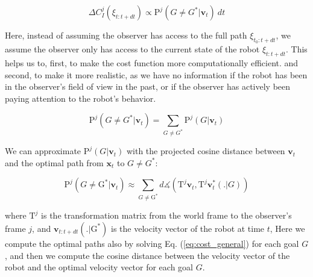 \begin{equation}
    \label{eq:cost_leg}
    \Delta C_{I}^j(\xi_{t:t+dt}) \propto  \mathrm{P}^j(G \neq G^* | \mathbf{v}_t) ~dt
\end{equation}

\noindent
Here, instead of assuming the observer has access to the full path $\xi_{t_0:t+dt}$,
we assume the observer only has access to the current state of the robot $\xi_{t:t+dt}$.
%
%
This helps us to, first, to make the cost function more computationally efficient.
and second, to make it more realistic, as we have no information if the robot has been in the observer's field of view in the past,
or if the observer has actively been paying attention to the robot's behavior.

\noindent

\begin{equation}
    \label{eq:prob_leg}
    \mathrm{P}^j(G \neq G^* | \mathbf{v}_t) = \sum_{G \neq G^*} \mathrm{P}^j(G | \mathbf{v}_t)
\end{equation}

\noindent
We can approximate $\mathrm{P}^j(G | \mathbf{v}_t)$ with the projected cosine distance between $\mathbf{v}_t$ and the optimal path from $\mathbf{x}_t$ to $G \neq G^*$:

\begin{equation}
    \label{eq:prob_leg_approx}
    \mathrm{P}^j(G \neq \mathrm G^* | \mathbf{v}_t) \approx
                        \sum_{G \neq \mathrm G^*}  d \measuredangle(
                                                                        \mathrm T^j \mathbf{v}_t,
                                                                        \mathrm T^j \mathbf{v}^*_t(.|G))
\end{equation}

\noindent
where $\mathrm T^j$ is the transformation matrix from the world frame to the observer's frame $j$,
and $\mathbf{v}_{t:t+dt}(.|\mathrm G^*)$ is the velocity vector of the robot at time $t$,
Here we compute the optimal paths also by solving Eq. (\ref{eq:cost_general}) for each goal $G$,
and then we compute the cosine distance between the velocity vector of the robot and the optimal velocity vector for each goal $G$.


